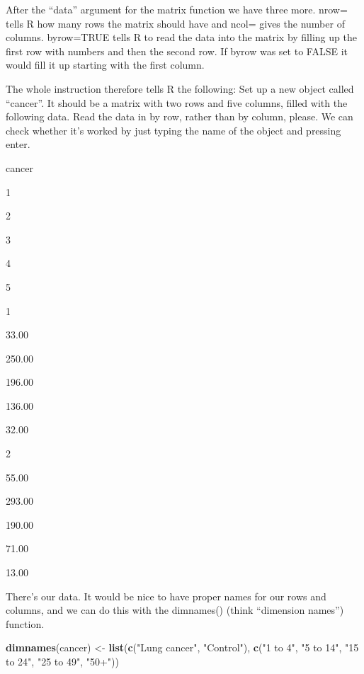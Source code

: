 \documentclass[
]{book}
\newenvironment{Shaded}{\begin{snugshade}}{\end{snugshade}}
\newcommand{\KeywordTok}[1]{\textcolor[rgb]{0.13,0.29,0.53}{\textbf{#1}}}
\newcommand{\NormalTok}[1]{#1}
\newcommand{\StringTok}[1]{\textcolor[rgb]{0.31,0.60,0.02}{#1}}
\begin{document}
After the ``data'' argument for the matrix function we have three more. nrow= tells R how many rows the matrix should have and ncol= gives the number of columns. byrow=TRUE tells R to read the data into the matrix by filling up the first row with numbers and then the second row. If byrow was set to FALSE it would fill it up starting with the first column.

The whole instruction therefore tells R the following:
Set up a new object called ``cancer''. It should be a matrix with two rows and five columns, filled with the following data. Read the data in by row, rather than by column, please.
We can check whether it's worked by just typing the name of the object and pressing enter.

\begin{Shaded}
\begin{Highlighting}[]
\NormalTok{cancer}
\end{Highlighting}
\end{Shaded}

1

2

3

4

5

1

33.00

250.00

196.00

136.00

32.00

2

55.00

293.00

190.00

71.00

13.00

There's our data. It would be nice to have proper names for our rows and columns, and we can do this with the dimnames() (think ``dimension names'') function.

\begin{Shaded}
\begin{Highlighting}[]
\KeywordTok{dimnames}\NormalTok{(cancer) <-}
\StringTok{  }\KeywordTok{list}\NormalTok{(}\KeywordTok{c}\NormalTok{(}\StringTok{"Lung cancer"}\NormalTok{, }\StringTok{"Control"}\NormalTok{),}
       \KeywordTok{c}\NormalTok{(}\StringTok{"1 to 4"}\NormalTok{, }\StringTok{"5 to 14"}\NormalTok{, }\StringTok{"15 to 24"}\NormalTok{, }\StringTok{"25 to 49"}\NormalTok{, }\StringTok{"50+"}\NormalTok{))}
\end{Highlighting}
\end{Shaded}
\end{document}
